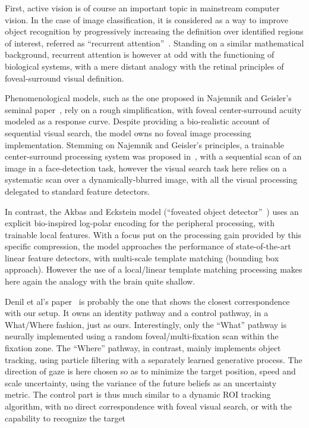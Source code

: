 First, active vision is of course an important topic in mainstream computer vision. In the case of image classification, it is considered as a way to improve object recognition by progressively increasing the definition over identified regions of interest, referred as ``recurrent attention''~\cite{mnih2014recurrent,fu2017look}.
Standing on a similar mathematical background, recurrent attention is however at odd with the functioning of biological systems, with a mere distant analogy with the retinal principles of foveal-surround visual definition.

Phenomenological models, such as the one proposed in Najemnik and Geisler's seminal paper~\cite{Najemnik05}, rely on a rough simplification, with foveal center-surround acuity modeled as a response curve. Despite providing a bio-realistic account of sequential visual search, the model owns no foveal image processing implementation. Stemming on Najemnik and Geisler's principles, a trainable center-surround processing system was proposed in~\cite{Butko2010infomax}, with a sequential scan of an image in a face-detection task, however the visual search task here relies on a systematic scan over a dynamically-blurred image, with all the visual processing delegated to standard feature detectors.

In contrast, the Akbas and Eckstein model (“foveated object detector”~\cite{akbas2017object}) uses an explicit bio-inspired log-polar encoding
for the peripheral processing, with trainable local features.
With a focus put on the processing gain provided by this specific compression,
the model approaches the performance of state-of-the-art linear feature detectors, with multi-scale template matching (bounding box approach). However the use of
a local/linear template matching processing makes here again the analogy with the brain quite shallow.


Denil et al's paper~\cite{denil2012learning} is probably the one that shows the closest correspondence with our setup. It owns an identity pathway and a control pathway, in a What/Where fashion, just as ours. Interestingly, only the ``What'' pathway is neurally implemented using a random foveal/multi-fixation scan within the fixation zone. The ``Where'' pathway, in contrast, mainly implements object tracking, using particle filtering with a separately learned generative process. The direction of gaze is here chosen so as to minimize the target position, speed and scale uncertainty, using the variance of the future beliefs as an uncertainty metric. The control part is thus much similar to a dynamic ROI tracking algorithm, with no direct correspondence with foveal visual search, or with the capability to recognize the target

